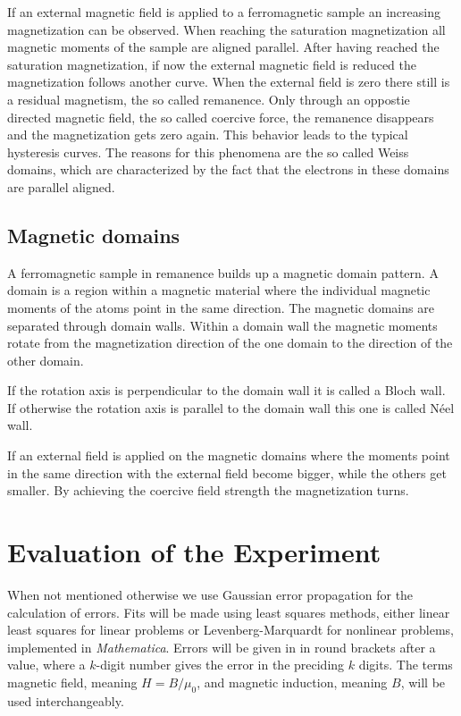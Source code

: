 \documentclass[a4paper,10pt]{scrartcl}
\begin{document}
If an external magnetic field is applied to a ferromagnetic sample an increasing  magnetization can be observed. 
When reaching the saturation magnetization all magnetic moments of the sample are aligned parallel.
After having reached the saturation magnetization, if now the external magnetic field is reduced the magnetization follows another curve. 
When the external field is zero there still is a residual magnetism, the so called remanence. Only through an oppostie directed magnetic field, the so called coercive force, the remanence disappears and the magnetization gets zero again. 
This behavior leads to the typical hysteresis curves. The reasons for this phenomena are the so called Weiss domains, which are characterized by the fact
that the electrons in these domains are parallel aligned. 

\subsection{Magnetic domains}
A ferromagnetic sample in remanence builds up a magnetic domain pattern. A domain is a region within a magnetic material where the individual magnetic moments of the atoms point in the same direction.
The magnetic domains are separated through domain walls. Within a domain wall the magnetic moments rotate from the magnetization direction of the one domain to the direction of the other domain.
 
If the rotation axis is perpendicular to the domain wall it is called a Bloch wall. 
If otherwise the rotation axis is parallel to the domain wall this one is called N\'{e}el wall. 

If an external field is applied on the magnetic domains where the moments point in the same direction with the external field become bigger, while the others get smaller. By achieving the coercive field strength the magnetization turns.

\section{Evaluation of the Experiment}

When not mentioned otherwise we use Gaussian error propagation for the calculation of errors. Fits will be made using least squares methods, either linear least squares for linear problems or Levenberg-Marquardt for nonlinear problems, implemented in \textit{Mathematica}. Errors will be given in in round brackets after a value, where a $k$-digit number gives the error in the preciding $k$ digits. 
The terms magnetic field, meaning $H=B/\mu_0$, and magnetic induction, meaning $B$, will be used interchangeably.
\end{document}
